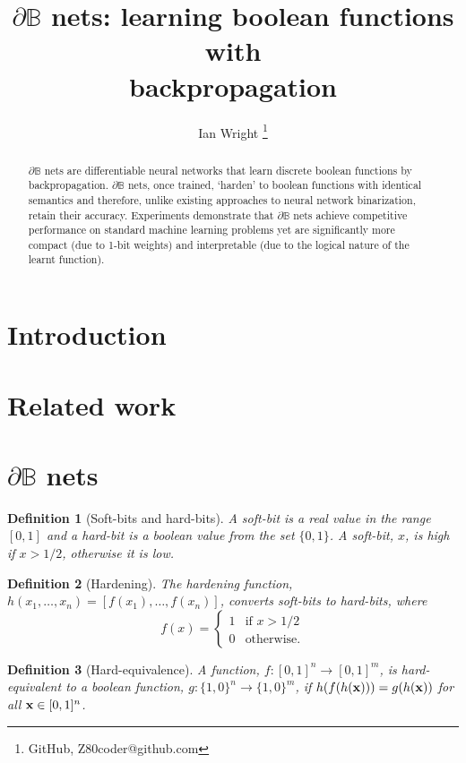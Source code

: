 \documentclass{article} %
\title{$\partial\mathbb{B}$ nets: learning boolean functions with\\backpropagation}
\author{Ian Wright \thanks{GitHub, Z80coder@github.com}
}
\newtheorem*{definition}{Definition}
\begin{document}
\maketitle

\begin{abstract}
	$\partial\mathbb{B}$ nets are differentiable neural networks 
	that learn discrete boolean functions by backpropagation.
	$\partial\mathbb{B}$ nets, once trained, `harden' to boolean functions with identical semantics and therefore, unlike existing approaches to neural network binarization, retain their accuracy. Experiments demonstrate that $\partial\mathbb{B}$ nets achieve competitive performance on standard machine learning problems yet are significantly more compact (due to 1-bit weights) and interpretable (due to the logical nature of the learnt function).
\end{abstract}

\section{Introduction}

\section{Related work}

\section{$\partial\mathbb{B}$ nets}

\begin{definition}[Soft-bits and hard-bits]
A {\em soft-bit} is a real value in the range $[0,1]$ and a {\em hard-bit} is a boolean value from the set $\{0,1\}$. A soft-bit, $x$, is {\em high} if $x>1/2$, otherwise it is {\em low}.
\end{definition}

\begin{definition}[Hardening]
The {\em hardening} function, $h(x_{1}, \dots, x_{n}) = [f(x_{1}), \dots, f(x_{n})]$, converts soft-bits to hard-bits, where
\begin{equation*}
f(x) =
\begin{cases}
1 & \text{if } x > 1/2 \\
0 & \text{otherwise.}
\end{cases}
\end{equation*}
\end{definition}

\begin{definition}[Hard-equivalence]
	A function, $f: [0,1]^n \rightarrow [0,1]^m$, is {\em hard-equivalent} to a boolean function, $g: \{1,0\}^n \rightarrow \{1,0\}^m$,	if
	$h(f(h({\bf x}))) = g(h({\bf x}))$ for all ${\bf x} \in [0,1]^{n}$.
\end{definition}
\end{document}
